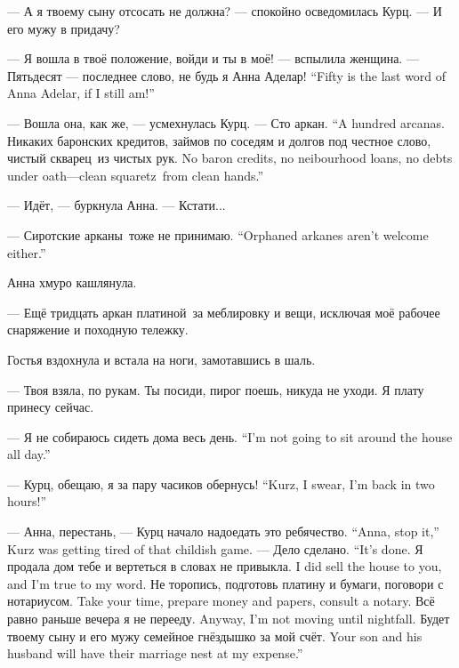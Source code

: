 --- А я твоему сыну отсосать не должна? --- спокойно осведомилась Курц.
--- И его мужу в придачу?

--- Я вошла в твоё положение, войди и ты в моё! --- вспылила женщина.
{--- Пятьдесят --- последнее слово, не будь я Анна Аделар!}
{``Fifty is the last word of Anna Adelar, if I still am!''}

--- Вошла она, как же, --- усмехнулась Курц.
{--- Сто аркан.}
{``A hundred arcanas.}
{Никаких баронских кредитов, займов по соседям и долгов под честное слово, чистый скварец\FM\ из чистых рук.}
{No baron credits, no neibourhood loans, no debts under oath---clean squaretz\FM\ from clean hands.''}

--- Идёт, --- буркнула Анна.
--- Кстати...

{--- Сиротские арканы\FM\ тоже не принимаю.}
{``Orphaned arkanes aren't welcome either.''}

Анна хмуро кашлянула.

--- Ещё тридцать аркан платиной\FM\ за меблировку и вещи, исключая моё рабочее снаряжение и походную тележку.

Гостья вздохнула и встала на ноги, замотавшись в шаль.

--- Твоя взяла, по рукам.
Ты посиди, пирог поешь, никуда не уходи.
Я плату принесу сейчас.

{--- Я не собираюсь сидеть дома весь день.}
{``I'm not going to sit around the house all day.''}

{--- Курц, обещаю, я за пару часиков обернусь!}
{``Kurz, I swear, I'm back in two hours!''}

{--- Анна, перестань, --- Курц начало надоедать это ребячество.}
{``Anna, stop it,'' Kurz was getting tired of that childish game.}
{--- Дело сделано.}
{``It's done.}
{Я продала дом тебе и вертеться в словах не привыкла.}
{I did sell the house to you, and I'm true to my word.}
{Не торопись, подготовь платину и бумаги, поговори с нотариусом.}
{Take your time, prepare money and papers, consult a notary.}
{Всё равно раньше вечера я не перееду.}
{Anyway, I'm not moving until nightfall.}
{Будет твоему сыну и его мужу семейное гнёздышко за мой счёт.}
{Your son and his husband will have their marriage nest at my expense.''}

